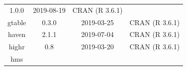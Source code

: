 \documentclass[11pt,]{book}
\begin{document}
\begin{longtable}[]{@{}cccc@{}}
\begin{minipage}[t]{0.19\columnwidth}
1.0.0\strut
\end{minipage} & \begin{minipage}[t]{0.16\columnwidth}\centering\strut
2019-08-19\strut
\end{minipage} & \begin{minipage}[t]{0.36\columnwidth}\centering\strut
CRAN (R 3.6.1)\strut
\end{minipage}\tabularnewline
\begin{minipage}[t]{0.18\columnwidth}\centering\strut
gtable\strut
\end{minipage} & \begin{minipage}[t]{0.19\columnwidth}\centering\strut
0.3.0\strut
\end{minipage} & \begin{minipage}[t]{0.16\columnwidth}\centering\strut
2019-03-25\strut
\end{minipage} & \begin{minipage}[t]{0.36\columnwidth}\centering\strut
CRAN (R 3.6.1)\strut
\end{minipage}\tabularnewline
\begin{minipage}[t]{0.18\columnwidth}\centering\strut
haven\strut
\end{minipage} & \begin{minipage}[t]{0.19\columnwidth}\centering\strut
2.1.1\strut
\end{minipage} & \begin{minipage}[t]{0.16\columnwidth}\centering\strut
2019-07-04\strut
\end{minipage} & \begin{minipage}[t]{0.36\columnwidth}\centering\strut
CRAN (R 3.6.1)\strut
\end{minipage}\tabularnewline
\begin{minipage}[t]{0.18\columnwidth}\centering\strut
highr\strut
\end{minipage} & \begin{minipage}[t]{0.19\columnwidth}\centering\strut
0.8\strut
\end{minipage} & \begin{minipage}[t]{0.16\columnwidth}\centering\strut
2019-03-20\strut
\end{minipage} & \begin{minipage}[t]{0.36\columnwidth}\centering\strut
CRAN (R 3.6.1)\strut
\end{minipage}\tabularnewline
\begin{minipage}[t]{0.18\columnwidth}\centering\strut
hms\strut
\end{minipage} & \begin{minipage}[t]{0.19\columnwidth}\centering\strut

\end{minipage}
\end{longtable}
\end{document}
